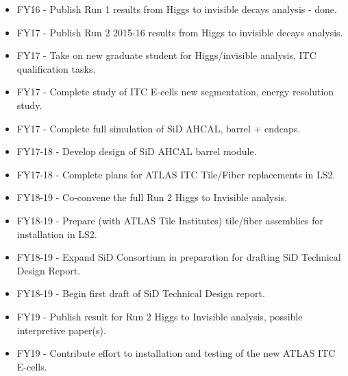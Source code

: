 \vspace*{0.1in}
\begin{itemize}[noitemsep,nolistsep]

\item{FY16 - Publish Run 1 results from Higgs to invisible decays analysis - done.}
\item{FY17 - Publish Run 2 2015-16 results from Higgs to invisible decays analysis.}
\item{FY17 - Take on new graduate student for Higgs/invisible analysis, ITC qualification tasks.}
\item{FY17 - Complete study of ITC E-cells new segmentation, energy resolution study.}
\item{FY17 - Complete full simulation of SiD AHCAL, barrel + endcaps.}
\item{FY17-18 - Develop design of SiD AHCAL barrel module.}
\item{FY17-18 - Complete plans for ATLAS ITC Tile/Fiber replacements in LS2.}
\item{FY18-19 - Co-convene the full Run 2 Higgs to Invisible analysis.}
\item{FY18-19 - Prepare (with ATLAS Tile Institutes) tile/fiber assemblies for installation in LS2.}
\item{FY18-19 - Expand SiD Consortium in preparation for drafting SiD Technical Design Report.}
\item{FY18-19 - Begin first draft of SiD Technical Design report.}
\item{FY19 - Publish result for Run 2 Higgs to Invisible analysis, possible interpretive paper(s).}
\item{FY19 - Contribute effort to installation and testing of the new ATLAS ITC E-cells.}

\end{itemize}

